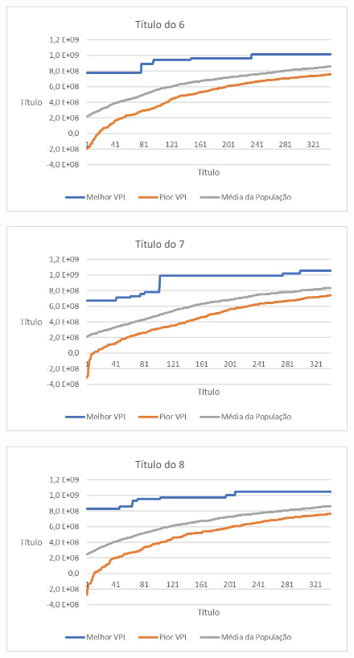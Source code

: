 \documentclass[12pt,a4paper]{report}
\begin{document}
\begin{figure}[H]
\centering

\includegraphics[scale=1]{ApE/AGRPCO1/6}

\end{figure}
\begin{figure}[H]
\centering

\includegraphics[scale=1]{ApE/AGRPCO1/7}

\end{figure}
\begin{figure}[H]
\centering

\includegraphics[scale=1]{ApE/AGRPCO1/8}

\end{figure}
\end{document}
